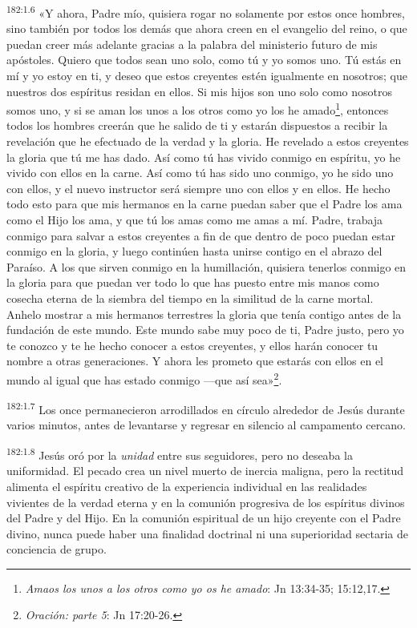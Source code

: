 \par
\textsuperscript{182:1.6} «Y ahora, Padre mío, quisiera rogar no solamente por estos once hombres, sino también por todos los demás que ahora creen en el evangelio del reino, o que puedan creer más adelante gracias a la palabra del ministerio futuro de mis apóstoles. Quiero que todos sean uno solo, como tú y yo somos uno. Tú estás en mí y yo estoy en ti, y deseo que estos creyentes estén igualmente en nosotros; que nuestros dos espíritus residan en ellos. Si mis hijos son uno solo como nosotros somos uno, y si se aman los unos a los otros como yo los he amado\footnote{\textit{Amaos los unos a los otros como yo os he amado}: Jn 13:34-35; 15:12,17.}, entonces todos los hombres creerán que he salido de ti y estarán dispuestos a recibir la revelación que he efectuado de la verdad y la gloria. He revelado a estos creyentes la gloria que tú me has dado. Así como tú has vivido conmigo en espíritu, yo he vivido con ellos en la carne. Así como tú has sido uno conmigo, yo he sido uno con ellos, y el nuevo instructor será siempre uno con ellos y en ellos. He hecho todo esto para que mis hermanos en la carne puedan saber que el Padre los ama como el Hijo los ama, y que tú los amas como me amas a mí. Padre, trabaja conmigo para salvar a estos creyentes a fin de que dentro de poco puedan estar conmigo en la gloria, y luego continúen hasta unirse contigo en el abrazo del Paraíso. A los que sirven conmigo en la humillación, quisiera tenerlos conmigo en la gloria para que puedan ver todo lo que has puesto entre mis manos como cosecha eterna de la siembra del tiempo en la similitud de la carne mortal. Anhelo mostrar a mis hermanos terrestres la gloria que tenía contigo antes de la fundación de este mundo. Este mundo sabe muy poco de ti, Padre justo, pero yo te conozco y te he hecho conocer a estos creyentes, y ellos harán conocer tu nombre a otras generaciones. Y ahora les prometo que estarás con ellos en el mundo al igual que has estado conmigo ---que así sea»\footnote{\textit{Oración: parte 5}: Jn 17:20-26.}.

\par
\textsuperscript{182:1.7} Los once permanecieron arrodillados en círculo alrededor de Jesús durante varios minutos, antes de levantarse y regresar en silencio al campamento cercano.

\par
\textsuperscript{182:1.8} Jesús oró por la \textit{unidad} entre sus seguidores, pero no deseaba la uniformidad. El pecado crea un nivel muerto de inercia maligna, pero la rectitud alimenta el espíritu creativo de la experiencia individual en las realidades vivientes de la verdad eterna y en la comunión progresiva de los espíritus divinos del Padre y del Hijo. En la comunión espiritual de un hijo creyente con el Padre divino, nunca puede haber una finalidad doctrinal ni una superioridad sectaria de conciencia de grupo.


